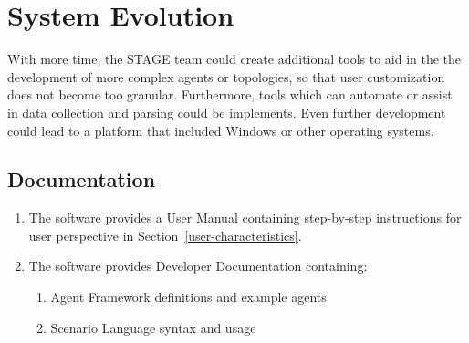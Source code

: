 \documentclass[titlepage]{article}
\begin{document}
\section{System Evolution}

With more time, the STAGE team could create additional tools to aid in the the development of more complex agents or topologies, so that user customization does not become too granular.  Furthermore, tools which can automate or assist in data collection and parsing could be implements.  Even further development could lead to a platform that included Windows or other operating systems.


\subsection{Documentation%
  \label{documentation}%
}
\begin{enumerate}
    \item The software provides a User Manual containing step-by-step instructions for user perspective in Section~\ref{user-characteristics}.
    \item The software provides Developer Documentation containing:
    \begin{enumerate}
        \item Agent Framework definitions and example agents
        \item Scenario Language syntax and usage
    \end{enumerate}
\end{enumerate}


\appendix
\pagebreak
\end{document}
